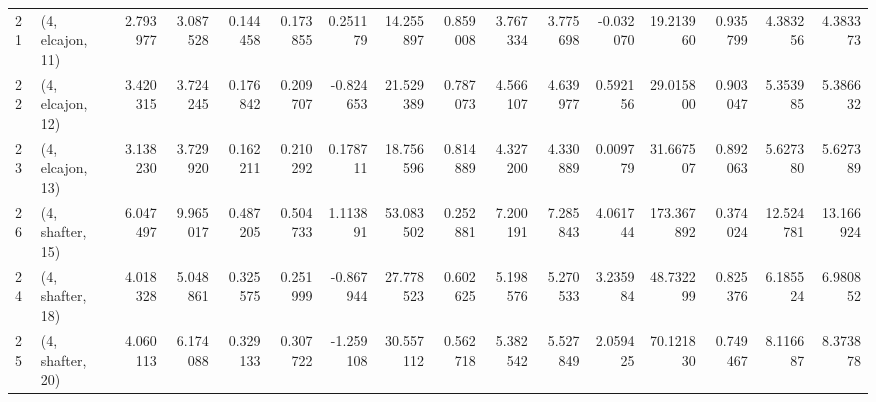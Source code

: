 \begin{tabular}{llrrrrrrrrrrrrrr}
21 &  (4, elcajon, 11) &  2.793977 &   3.087528 &   0.144458 &  0.173855 &  0.251179 &  14.255897 &  0.859008 &   3.767334 &  3.775698 & -0.032070 &   19.213960 &  0.935799 &   4.383256 &   4.383373 \\
22 &  (4, elcajon, 12) &  3.420315 &   3.724245 &   0.176842 &  0.209707 & -0.824653 &  21.529389 &  0.787073 &   4.566107 &  4.639977 &  0.592156 &   29.015800 &  0.903047 &   5.353985 &   5.386632 \\
23 &  (4, elcajon, 13) &  3.138230 &   3.729920 &   0.162211 &  0.210292 &  0.178711 &  18.756596 &  0.814889 &   4.327200 &  4.330889 &  0.009779 &   31.667507 &  0.892063 &   5.627380 &   5.627389 \\
26 &  (4, shafter, 15) &  6.047497 &   9.965017 &   0.487205 &  0.504733 &  1.113891 &  53.083502 &  0.252881 &   7.200191 &  7.285843 &  4.061744 &  173.367892 &  0.374024 &  12.524781 &  13.166924 \\
24 &  (4, shafter, 18) &  4.018328 &   5.048861 &   0.325575 &  0.251999 & -0.867944 &  27.778523 &  0.602625 &   5.198576 &  5.270533 &  3.235984 &   48.732299 &  0.825376 &   6.185524 &   6.980852 \\
25 &  (4, shafter, 20) &  4.060113 &   6.174088 &   0.329133 &  0.307722 & -1.259108 &  30.557112 &  0.562718 &   5.382542 &  5.527849 &  2.059425 &   70.121830 &  0.749467 &   8.116687 &   8.373878 \\
\bottomrule
\end{tabular}
